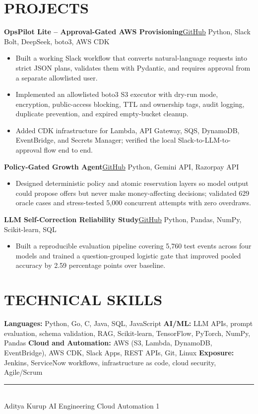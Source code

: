 \documentclass[10pt,letterpaper]{article}
\newcommand{\resumeRole}[2]{\textbf{#1}\hfill{\color{gray}#2}\\[-1pt]}
\newcommand{\resumeBullet}[1]{\item \small #1}
\begin{document}
\section*{PROJECTS}
\resumeRole{OpsPilot Lite -- Approval-Gated AWS Provisioning}{\href{https://github.com/aditya-kurup/opspilot-lite}{GitHub} \textbar\; Python, Slack Bolt, DeepSeek, boto3, AWS CDK}
\begin{itemize}
  \resumeBullet{Built a working Slack workflow that converts natural-language requests into strict JSON plans, validates them with Pydantic, and requires approval from a separate allowlisted user.}
  \resumeBullet{Implemented an allowlisted boto3 S3 executor with dry-run mode, encryption, public-access blocking, TTL and ownership tags, audit logging, duplicate prevention, and expired empty-bucket cleanup.}
  \resumeBullet{Added CDK infrastructure for Lambda, API Gateway, SQS, DynamoDB, EventBridge, and Secrets Manager; verified the local Slack-to-LLM-to-approval flow end to end.}
\end{itemize}
\resumeRole{Policy-Gated Growth Agent}{\href{https://github.com/aditya-kurup}{GitHub} \textbar\; Python, Gemini API, Razorpay API}
\begin{itemize}
  \resumeBullet{Designed deterministic policy and atomic reservation layers so model output could propose offers but never make money-affecting decisions; validated 629 oracle cases and stress-tested 5,000 concurrent attempts with zero overdraws.}
\end{itemize}
\resumeRole{LLM Self-Correction Reliability Study}{\href{https://github.com/aditya-kurup}{GitHub} \textbar\; Python, Pandas, NumPy, Scikit-learn, SQL}
\begin{itemize}
  \resumeBullet{Built a reproducible evaluation pipeline covering 5,760 test events across four models and trained a question-grouped logistic gate that improved pooled accuracy by 2.59 percentage points over baseline.}
\end{itemize}

\section*{TECHNICAL SKILLS}
\small \textbf{Languages:} Python, Go, C, Java, SQL, JavaScript \textbar\; \textbf{AI/ML:} LLM APIs, prompt evaluation, schema validation, RAG, Scikit-learn, TensorFlow, PyTorch, NumPy, Pandas \textbar\; \textbf{Cloud and Automation:} AWS (S3, Lambda, DynamoDB, EventBridge), AWS CDK, Slack Apps, REST APIs, Git, Linux \textbar\; \textbf{Exposure:} Jenkins, ServiceNow workflows, infrastructure as code, cloud security, Agile/Scrum

\vfill
\color{gray}\rule{\linewidth}{0.4pt}\\[-1pt]
\scriptsize Aditya Kurup \hfill AI Engineering \textbar\; Cloud Automation \hfill 1
\end{document}
